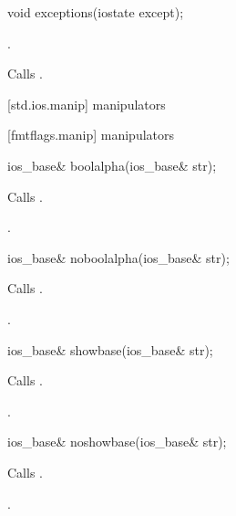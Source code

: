 %
\begin{itemdecl}
void exceptions(iostate except);
\end{itemdecl}

\begin{itemdescr}
\pnum
\postcondition
{}.

\pnum
\effects
Calls
.
\end{itemdescr}

[std.ios.manip]{ manipulators}

[fmtflags.manip]{ manipulators}

%
\begin{itemdecl}
ios_base& boolalpha(ios_base& str);
\end{itemdecl}

\begin{itemdescr}
\pnum
\effects
Calls
.

\pnum
\returns
{}.
\end{itemdescr}

%
\begin{itemdecl}
ios_base& noboolalpha(ios_base& str);
\end{itemdecl}

\begin{itemdescr}
\pnum
\effects
Calls
.

\pnum
\returns
{}.
\end{itemdescr}

%
\begin{itemdecl}
ios_base& showbase(ios_base& str);
\end{itemdecl}

\begin{itemdescr}
\pnum
\effects
Calls
.

\pnum
\returns
{}.
\end{itemdescr}

%
\begin{itemdecl}
ios_base& noshowbase(ios_base& str);
\end{itemdecl}

\begin{itemdescr}
\pnum
\effects
Calls
.

\pnum
\returns
{}.
\end{itemdescr}

